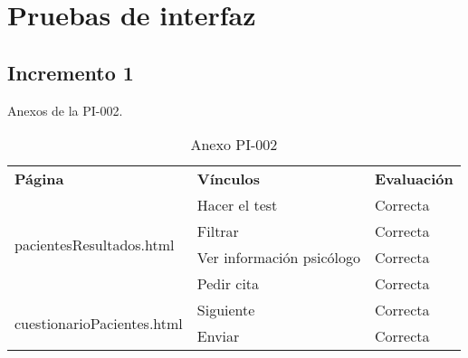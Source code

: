 \section{Pruebas de interfaz}

\subsection{Incremento 1}

Anexos de la PI-002.

\begin{table}[htpb]
\centering
\begin{tabularx}{\textwidth}{|l|X|X|}
\hline
\rowcolor[gray]{0.9}\multicolumn{3}{|l|}{\textbf{Anexo PI-002}}                                                    \\ \hline
\textbf{Página}                             & \textbf{Vínculos}         & \textbf{Evaluación} \\ \hline
\multirow{4}{*}{pacientesResultados.html}   & Hacer el test             & Correcta            \\ \cline{2-3} 
                                            & Filtrar                   & Correcta            \\ \cline{2-3} 
                                            & Ver información psicólogo & Correcta            \\ \cline{2-3} 
                                            & Pedir cita                & Correcta            \\ \hline
\multirow{2}{*}{cuestionarioPacientes.html} & Siguiente                 & Correcta            \\ \cline{2-3} 
                                            & Enviar                    & Correcta            \\ \hline
\end{tabularx}
\caption{Anexo PI-002}
\end{table}


